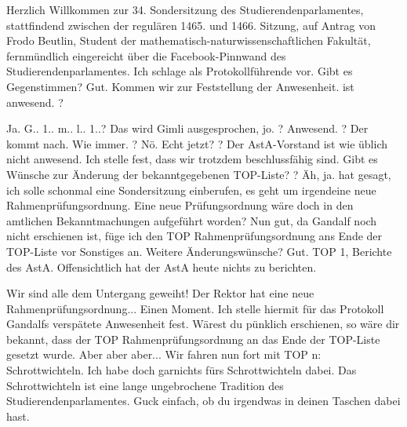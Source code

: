 \begin{verseplay}[10em]
\s{\Elron} Herzlich Willkommen zur 34. Sondersitzung des Studierendenparlamentes, stattfindend zwischen der regulären 1465. und 1466. Sitzung, auf Antrag von Frodo Beutlin, Student der mathematisch-naturwissenschaftlichen Fakultät, fernmündlich eingereicht über die Facebook-Pinnwand des Studierendenparlamentes. Ich schlage \Galadriel als Protokollführende vor. Gibt es Gegenstimmen?  Gut. Kommen wir zur Feststellung der Anwesenheit. \Galadriel ist anwesend. \Sum ?


\s{\Sum} Ja.
\s{\Elron} G.. 1.. m.. l.. 1..?
\s{\Gimli} Das wird Gimli ausgesprochen, jo.
\s{\Elron} \Legolars ?
\s{\Legolars} Anwesend. 
\s{\Elron} \Gandalf ?
\s{\Frodo} Der kommt nach.
\s{\Elron} Wie immer. \Frodo ?
\s{\Frodo} Nö.
\s{\Elron} Echt jetzt? \Saruman ?  Der AstA-Vorstand ist wie üblich nicht anwesend. Ich stelle fest, dass wir trotzdem beschlussfähig sind. Gibt es Wünsche zur Änderung der bekanntgegebenen TOP-Liste?  \Frodo?
\s{\Frodo} Äh, ja. \Gandalf hat gesagt, ich solle schonmal eine Sondersitzung einberufen, es geht um irgendeine neue Rahmenprüfungsordnung.
\s{\Elron} Eine neue Prüfungsordnung wäre doch in den amtlichen Bekanntmachungen aufgeführt worden?
\s{\Elron} Nun gut, da Gandalf noch nicht erschienen ist, füge ich den TOP Rahmenprüfungsordnung ans Ende der TOP-Liste vor Sonstiges an. Weitere Änderungswünsche?  Gut. TOP 1, Berichte des AstA.  Offensichtlich hat der AstA heute nichts zu berichten.


\s{\Gandalf} Wir sind alle dem Untergang geweiht! Der Rektor hat  eine neue Rahmenprüfungsordnung...
\s{\Elron} Einen Moment. Ich stelle hiermit für das Protokoll Gandalfs verspätete Anwesenheit fest. Wärest du pünklich erschienen, so wäre dir bekannt, dass der TOP Rahmenprüfungsordnung an das Ende der TOP-Liste gesetzt wurde.
\s{\Gandalf} Aber aber aber...
\s{\Elron}  Wir fahren nun fort mit TOP n: Schrottwichteln.
\s{\Frodo} Ich habe doch garnichts fürs Schrottwichteln dabei.
\s{\Elron} Das Schrottwichteln ist eine lange ungebrochene Tradition des Studierendenparlamentes. 
\s{\Sum} Guck einfach, ob du irgendwas in deinen Taschen dabei hast.


\end{verseplay}
